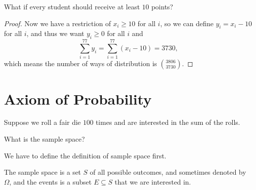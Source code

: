 \begin{eg}
    What if every student should receive at least \(10\) points? 
\end{eg}
\begin{proof}
    Now we have a restriction of \(x_i \ge 10\) for all \(i\), so we can define \(y_i = x_i - 10\) for all \(i\), and thus we want \(y_i \ge 0\) for all \(i\) and 
    \[
        \sum_{i=1}^{77} y_i = \sum_{i=1}^{77} (x_i - 10) = 3730,  
    \]      
    which means the number of ways of distribution is \(\binom{3806}{3730}\). 

\end{proof}

\chapter{Axiom of Probability}
Suppose we roll a fair die \(100\) times and are interested in the sum of the rolls. 
\begin{question}
    What is the sample space?
\end{question} 

We have to define the definition of sample space first. 

\begin{prev}
    The sample space is a set \(S\) of all possible outcomes, and sometimes denoted by \(\Omega \), and the events is a subset \(E \subseteq S\) that we are interested in.   
\end{prev}